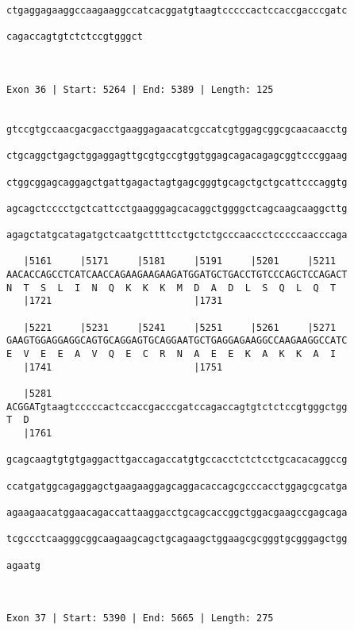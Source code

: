 \documentclass{article}
\begin{document}
\begin{Verbatim}
ctgaggagaaggccaagaaggccatcacggatgtaagtcccccactccaccgacccgatc
                                                            
cagaccagtgtctctccgtgggct
                        
                        
 
Exon 36 | Start: 5264 | End: 5389 | Length: 125


gtccgtgccaacgacgacctgaaggagaacatcgccatcgtggagcggcgcaacaacctg
                                                            
ctgcaggctgagctggaggagttgcgtgccgtggtggagcagacagagcggtcccggaag
                                                            
ctggcggagcaggagctgattgagactagtgagcgggtgcagctgctgcattcccaggtg
                                                            
agcagctcccctgctcattcctgaagggagcacaggctggggctcagcaagcaaggcttg
                                                            
agagctatgcatagatgctcaatgcttttcctgctctgcccaaccctcccccaacccaga
                                                            
   |5161     |5171     |5181     |5191     |5201     |5211  
AACACCAGCCTCATCAACCAGAAGAAGAAGATGGATGCTGACCTGTCCCAGCTCCAGACT
N  T  S  L  I  N  Q  K  K  K  M  D  A  D  L  S  Q  L  Q  T  
   |1721                         |1731                      
  
   |5221     |5231     |5241     |5251     |5261     |5271  
GAAGTGGAGGAGGCAGTGCAGGAGTGCAGGAATGCTGAGGAGAAGGCCAAGAAGGCCATC
E  V  E  E  A  V  Q  E  C  R  N  A  E  E  K  A  K  K  A  I  
   |1741                         |1751                      
  
   |5281                                                    
ACGGATgtaagtcccccactccaccgacccgatccagaccagtgtctctccgtgggctgg
T  D                                                        
   |1761
  
gcagcaagtgtgtgaggacttgaccagaccatgtgccacctctctcctgcacacaggccg

ccatgatggcagaggagctgaagaaggagcaggacaccagcgcccacctggagcgcatga

agaagaacatggaacagaccattaaggacctgcagcaccggctggacgaagccgagcaga

tcgccctcaagggcggcaagaagcagctgcagaagctggaagcgcgggtgcgggagctgg

agaatg
      

 
Exon 37 | Start: 5390 | End: 5665 | Length: 275



\end{Verbatim}
\end{document}

